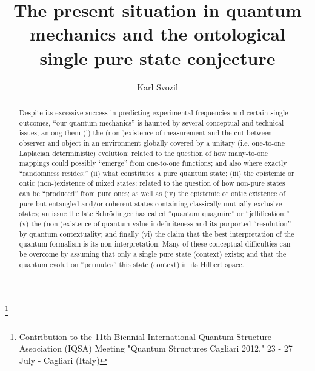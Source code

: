 \documentclass[%
  preprint,
 showpacs,
 showkeys,
 preprintnumbers,
 amsmath,amssymb,
 aps,
   pra,
  longbibliography,
 ]{revtex4-1}
\begin{document}
\title{The present situation in quantum mechanics and the ontological single pure state conjecture}


\author{Karl Svozil}
 
\thanks{Contribution to the 11th Biennial  International Quantum Structure Association  (IQSA) Meeting
"Quantum Structures Cagliari 2012," 23 - 27 July - Cagliari (Italy)}


\begin{abstract}
Despite its excessive success in predicting experimental frequencies and certain single outcomes,
``our quantum mechanics'' is haunted by several conceptual and technical issues; among them
(i) the (non-)existence of measurement and the cut between observer and object in an environment globally covered by a unitary (i.e. one-to-one Laplacian deterministic) evolution;
related to the question of how many-to-one mappings could possibly ``emerge'' from one-to-one functions; and also where exactly ``randomness resides;''
(ii) what constitutes a pure quantum state;
(iii) the epistemic or ontic (non-)existence of mixed states; related to the question of how non-pure states can be ``produced'' from pure ones; as well as
(iv) the epistemic or ontic existence of pure but entangled and/or coherent states containing classically mutually exclusive states;
an issue the late Schr\"odinger has called ``quantum quagmire'' or ``jellification;''
(v) the (non-)existence of quantum value indefiniteness and its purported ``resolution'' by quantum contextuality; and finally
(vi) the claim that the best interpretation of the quantum formalism is its non-interpretation.
Many of these conceptual difficulties can be overcome by assuming that only a single pure state (context) exists;
and that the quantum evolution ``permutes'' this state (context) in its Hilbert space.
\end{abstract}
\end{document}

